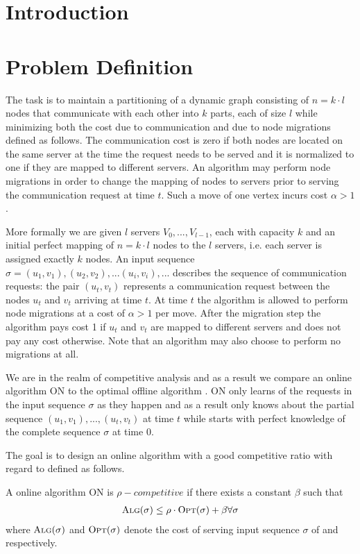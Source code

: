 \documentclass[xcolor=dvipsnames, tikz, 12pt]{article}
\newcommand{\opt}{\text{O{\scriptsize PT}}}
\newcommand{\alg}{\text{A{\scriptsize LG}}}
\theoremstyle{definition}
\begin{document}
{
	\hypersetup{linkcolor=black}
	\tableofcontents
	\clearpage
}


\section{Introduction}
	
	
	\section{Problem Definition}
	The task is to maintain a partitioning of a dynamic graph consisting of $n=k\cdot l$ nodes that communicate with each other into $k$ parts, each of size $l$ while minimizing both the cost due to communication and due to node migrations defined as follows. The communication cost is zero if both nodes are located on the same server at the time the request needs to be served and it is normalized to one if they are mapped to different servers. An algorithm may perform node migrations in order to change the mapping of nodes to servers prior to serving the communication request at time $t$. Such a move of one vertex incurs cost $\alpha>1$.
	
	More formally we are given $l$ servers $V_0,...,V_{l-1}$, each with capacity $k$ and an initial perfect mapping of $n=k\cdot l$ nodes to the $l$ servers, i.e. each server is assigned exactly $k$ nodes. An input sequence $\sigma=(u_1, v_1), (u_2, v_2),...(u_i,v_i),...$ describes the sequence of communication requests: the pair $(u_t, v_t)$ represents a communication request between the nodes $u_t$ and $v_t$ arriving at time $t$. At time $t$ the algorithm is allowed to perform node migrations at a cost of $\alpha>1$ per move. After the migration step the algorithm pays cost 1 if $u_t$ and $v_t$ are mapped to different servers and does not pay any cost otherwise. Note that an algorithm may also choose to perform no migrations at all.
	
	We are in the realm of competitive analysis and as a result we compare an online algorithm ON to the optimal offline algorithm \opt{}. ON only learns of the requests in the input sequence $\sigma$ as they happen and as a result only knows about the partial sequence $(u_1,v_1),...,(u_t,v_t)$ at time $t$ while \opt{} starts with perfect knowledge of the complete sequence $\sigma$ at time $0$.
	
	The goal is to design an online algorithm \alg{} with a good competitive ratio with regard to \opt{} defined as follows.
	
	A online algorithm ON is $\rho-competitive$ if there exists a constant $\beta$ such that \begin{align*}
	\alg{}(\sigma)\leq\rho\cdot \opt{}(\sigma)+\beta\forall \sigma
	\end{align*} 
	where $\alg{}(\sigma)$ and $\opt{}(\sigma)$ denote the cost of serving input sequence $\sigma$ of \alg{} and \opt{} respectively.
	
\end{document}
